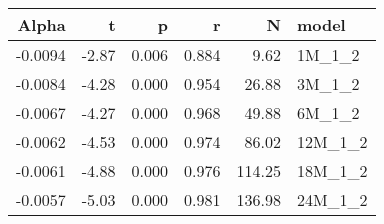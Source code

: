 \begin{table}[ht]
\centering
\begin{tabular}{rrrrrl}
  \hline
Alpha & t & p & r & N & model \\ 
  \hline
-0.0094 & -2.87 & 0.006 & 0.884 & 9.62 & 1M\_1\_2 \\ 
  -0.0084 & -4.28 & 0.000 & 0.954 & 26.88 & 3M\_1\_2 \\ 
  -0.0067 & -4.27 & 0.000 & 0.968 & 49.88 & 6M\_1\_2 \\ 
  -0.0062 & -4.53 & 0.000 & 0.974 & 86.02 & 12M\_1\_2 \\ 
  -0.0061 & -4.88 & 0.000 & 0.976 & 114.25 & 18M\_1\_2 \\ 
  -0.0057 & -5.03 & 0.000 & 0.981 & 136.98 & 24M\_1\_2 \\ 
   \hline
\end{tabular}
\end{table}

